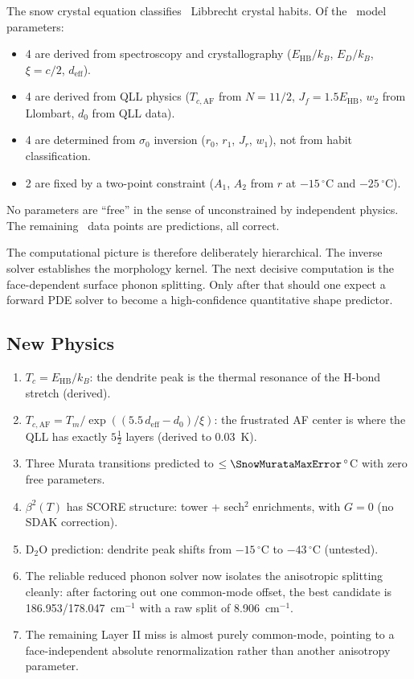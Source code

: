 \documentclass[12pt,letterpaper]{article}
\begin{document}
The snow crystal equation classifies \SnowHabitMatch\ Libbrecht crystal habits.  Of the \SnowParameterCount\ model parameters:
\begin{itemize}[nosep]
\item 4 are derived from spectroscopy and crystallography ($E_{\mathrm{HB}}/k_B$, $E_D/k_B$, $\xi = c/2$, $d_{\mathrm{eff}}$).
\item 4 are derived from QLL physics ($T_{c,\mathrm{AF}}$ from $N = 11/2$, $J_f = 1.5 E_{\mathrm{HB}}$, $w_2$ from Llombart, $d_0$ from QLL data).
\item 4 are determined from $\sigma_0$ inversion ($r_0$, $r_1$, $J_r$, $w_1$), not from habit classification.
\item 2 are fixed by a two-point constraint ($A_1$, $A_2$ from $r$ at $-15\,{}^\circ$C and $-25\,{}^\circ$C).
\end{itemize}
No parameters are ``free'' in the sense of unconstrained by independent physics.  The remaining \SnowPredictionPoints\ data points are predictions, all correct.

The computational picture is therefore deliberately hierarchical.
The inverse solver establishes the morphology kernel.
The next decisive computation is the face-dependent surface phonon
splitting.
Only after that should one expect a forward PDE solver to become a
high-confidence quantitative shape predictor.

\subsection{New Physics}

\begin{enumerate}[nosep]
\item $T_c = E_{\mathrm{HB}}/k_B$: the dendrite peak is the thermal resonance of the H-bond stretch (derived).
\item $T_{c,\mathrm{AF}} = T_m / \exp((5.5\,d_{\mathrm{eff}} - d_0)/\xi)$: the frustrated AF center is where the QLL has exactly $5\tfrac{1}{2}$ layers (derived to 0.03~K).
\item Three Murata transitions predicted to $\le \SnowMurataMaxError\,{}^\circ$C with zero free parameters.
\item $\beta^2(T)$ has SCORE structure: tower + sech$^2$ enrichments, with $G = 0$ (no SDAK correction).
\item D$_2$O prediction: dendrite peak shifts from $-15\,{}^\circ$C to $-43\,{}^\circ$C (untested).
\item The reliable reduced phonon solver now isolates the anisotropic splitting cleanly: after factoring out one common-mode offset, the best candidate is 186.953/178.047~cm$^{-1}$ with a raw split of 8.906~cm$^{-1}$.
\item The remaining Layer II miss is almost purely common-mode, pointing to a face-independent absolute renormalization rather than another anisotropy parameter.
\end{enumerate}
\end{document}
